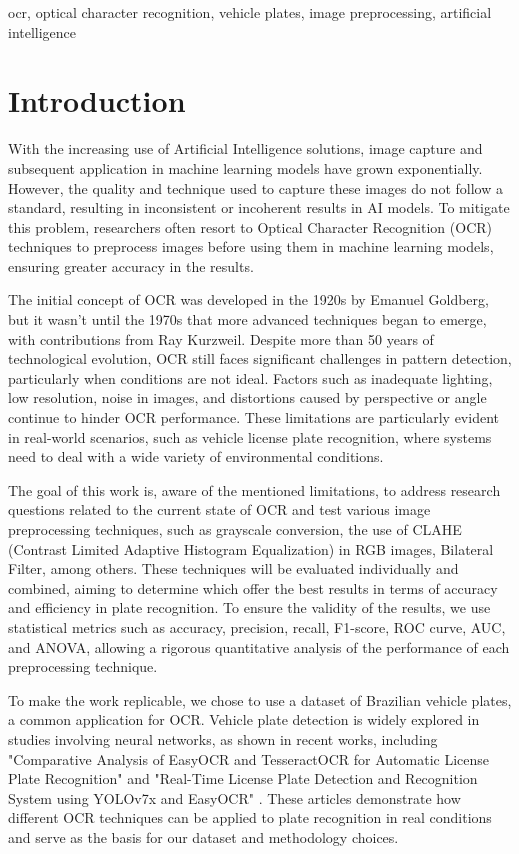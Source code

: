 \documentclass[conference]{IEEEtran}
\begin{document}
    \begin{IEEEkeywords} 
        ocr, optical character recognition, vehicle plates, image preprocessing, artificial intelligence
    \end{IEEEkeywords}
    
    \section{Introduction}
    With the increasing use of Artificial Intelligence solutions, image capture and subsequent application in machine learning models have grown exponentially. However, the quality and technique used to capture these images do not follow a standard, resulting in inconsistent or incoherent results in AI models. To mitigate this problem, researchers often resort to Optical Character Recognition (OCR) techniques to preprocess images before using them in machine learning models, ensuring greater accuracy in the results.
    
    The initial concept of OCR was developed in the 1920s by Emanuel Goldberg, but it wasn't until the 1970s that more advanced techniques began to emerge, with contributions from Ray Kurzweil. Despite more than 50 years of technological evolution, OCR still faces significant challenges in pattern detection, particularly when conditions are not ideal. Factors such as inadequate lighting, low resolution, noise in images, and distortions caused by perspective or angle continue to hinder OCR performance. These limitations are particularly evident in real-world scenarios, such as vehicle license plate recognition, where systems need to deal with a wide variety of environmental conditions.
    
    The goal of this work is, aware of the mentioned limitations, to address research questions related to the current state of OCR and test various image preprocessing techniques, such as grayscale conversion, the use of CLAHE (Contrast Limited Adaptive Histogram Equalization) in RGB images, Bilateral Filter, among others. These techniques will be evaluated individually and combined, aiming to determine which offer the best results in terms of accuracy and efficiency in plate recognition. To ensure the validity of the results, we use statistical metrics such as accuracy, precision, recall, F1-score, ROC curve, AUC, and ANOVA, allowing a rigorous quantitative analysis of the performance of each preprocessing technique.
    
    To make the work replicable, we chose to use a dataset of Brazilian vehicle plates, a common application for OCR. Vehicle plate detection is widely explored in studies involving neural networks, as shown in recent works, including "Comparative Analysis of EasyOCR and TesseractOCR for Automatic License Plate Recognition" \cite{b1} and "Real-Time License Plate Detection and Recognition System using YOLOv7x and EasyOCR" \cite{b2}. These articles demonstrate how different OCR techniques can be applied to plate recognition in real conditions and serve as the basis for our dataset and methodology choices.
    
\end{document}
